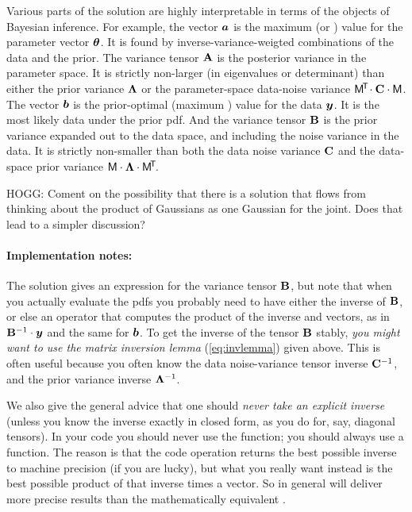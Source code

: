 Various parts of the solution are highly interpretable in terms of the
objects of Bayesian inference. For example, the vector $\boldsymbol{a}$ is the
maximum  (or ) value for the parameter vector
$\boldsymbol{\theta}$.
It is found by inverse-variance-weigted combinations of the data and the prior.
The variance tensor $\mathbf{A}$ is the posterior variance in the parameter space.
It is strictly non-larger (in eigenvalues or determinant) than either
the prior variance $\mathbf{\Lambda}$ or the parameter-space data-noise
variance $\mathsf{M}^{\!\mathsf{T}\!}\cdot\mathbf{C}\cdot\mathsf{M}$.
The vector $\boldsymbol{b}$ is the prior-optimal (maximum )
value for the data $\boldsymbol{y}$.
It is the most likely data under the prior pdf.
And the variance tensor $\mathbf{B}$ is the prior variance expanded out to the
data space, and including the noise variance in the data.
It is strictly non-smaller than both the data noise variance $\mathbf{C}$ and the
data-space prior variance $\mathsf{M}\cdot\mathbf{\Lambda}\cdot\mathsf{M}^{\!\mathsf{T}\!}$.

HOGG: Coment on the possibility that there is a solution that flows
from thinking about the product of Gaussians as one Gaussian for the
joint. Does that lead to a simpler discussion?

\paragraph{Implementation notes:}
The solution gives an expression for the variance tensor $\mathbf{B}$, but
note that when you actually evaluate the pdfs you probably need to
have either the inverse of $\mathbf{B}$, or else an operator that computes
the product of the inverse and vectors, as in $\mathbf{B}^{-1}\cdot\boldsymbol{y}$ and
the same for $\boldsymbol{b}$.
To get the inverse of the tensor $\mathbf{B}$ stably, \emph{you might want to use
the matrix inversion lemma} (\ref{eq:invlemma}) given above.
This is often useful because you often know the data noise-variance
tensor inverse $\mathbf{C}^{-1}$, and the prior variance inverse
$\mathbf{\Lambda}^{-1}$.

We also give the general advice that one should \emph{never take an explicit
inverse} (unless you know the inverse exactly in closed form, as you do
for, say, diagonal tensors).
In your code you should never use the  function; you
should always use a  function.
The reason is that the code operation  returns the best
possible inverse to machine precision (if you are lucky), but what you
really want instead is the best possible product of that inverse times
a vector.
So in general  will deliver more precise results than
the mathematically equivalent .

